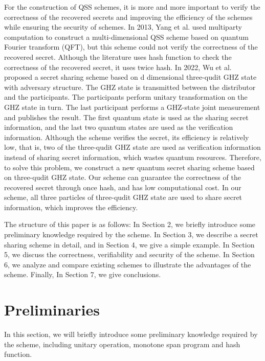 \documentclass[pdflatex,sn-mathphys]{sn-jnl}%
\theoremstyle{thmstyleone}%
\theoremstyle{thmstyletwo}%
\theoremstyle{thmstylethree}%
\begin{document}
\indent For the construction of QSS schemes, it is more and more important to verify the correctness of the recovered secrets and improving the efficiency of the schemes while ensuring the security of schemes. In 2013, Yang et al. \cite{ref-ur15} used multiparty computation to construct a multi-dimensional QSS scheme based on quantum Fourier transform (QFT), but this scheme could not verify the correctness of the recovered secret. Although the literature \cite{ref-ur20} uses hash function to check the correctness of the recovered secret, it uses twice hash. In 2022, Wu et al. \cite{ref-ur21} proposed a secret sharing scheme based on d dimensional three-qudit GHZ state with adversary structure. The GHZ state is transmitted between the distributor and the participants. The participants perform unitary transformation on the GHZ state in turn. The last participant performs a GHZ-state joint measurement and publishes the result. The first quantum state is used as the sharing secret information, and the last two quantum states are used as the verification information. Although the scheme verifies the secret, its efficiency is relatively low, that is, two of the three-qudit GHZ state are used as verification information instead of sharing secret information, which wastes quantum resources. Therefore, to solve this problem, we construct a new quantum secret sharing scheme based on three-qudit GHZ state. Our scheme can guarantee the correctness of the recovered secret through once hash, and has low computational cost. In our scheme, all three particles of three-qudit GHZ state are used to share secret information, which improves the efficiency.

The structure of this paper is as follows: In Section 2, we briefly introduce some preliminary knowledge required by the scheme. In Section 3, we describe a secret sharing scheme in detail, and in Section 4, we give a simple example. In Section 5, we discuss the correctness, verifiability and security of the scheme. In Section 6, we analyze and compare existing schemes to illustrate the advantages of the scheme. Finally, In Section 7, we give conclusions.

\section{Preliminaries}\label{sec2}

In this section, we will briefly introduce some preliminary knowledge required by the scheme, including unitary operation, monotone span program and hash function.
\end{document}
